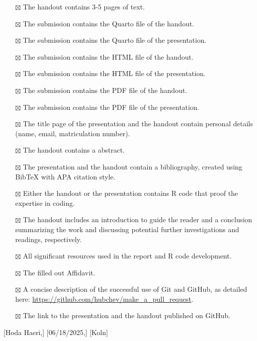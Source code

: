\documentclass[
  man,
  floatsintext,
  longtable,
  nolmodern,
  notxfonts,
  notimes,
  colorlinks=true,linkcolor=blue,citecolor=blue,urlcolor=blue]{apa7}
\providecommand{\tightlist}{%
  \setlength{\itemsep}{0pt}\setlength{\parskip}{0pt}}
\begin{document}
\begin{itemize}
\tightlist
\item[$\boxtimes$]
  The handout contains 3-5 pages of text.
\item[$\boxtimes$]
  The submission contains the Quarto file of the handout.
\item[$\boxtimes$]
  The submission contains the Quarto file of the presentation.
\item[$\boxtimes$]
  The submission contains the HTML file of the handout.
\item[$\boxtimes$]
  The submission contains the HTML file of the presentation.
\item[$\boxtimes$]
  The submission contains the PDF file of the handout.
\item[$\boxtimes$]
  The submission contains the PDF file of the presentation.
\item[$\boxtimes$]
  The title page of the presentation and the handout contain personal
  details (name, email, matriculation number).
\item[$\boxtimes$]
  The handout contains a abstract.
\item[$\boxtimes$]
  The presentation and the handout contain a bibliography, created using
  BibTeX with APA citation style.
\item[$\boxtimes$]
  Either the handout or the presentation contains R code that proof the
  expertise in coding.
\item[$\boxtimes$]
  The handout includes an introduction to guide the reader and a
  conclusion summarizing the work and discussing potential further
  investigations and readings, respectively.
\item[$\boxtimes$]
  All significant resources used in the report and R code development.
\item[$\boxtimes$]
  The filled out Affidavit.
\item[$\boxtimes$]
  A concise description of the successful use of Git and GitHub, as
  detailed here: \url{https://github.com/hubchev/make_a_pull_request}.
\item[$\boxtimes$]
  The link to the presentation and the handout published on GitHub.
\end{itemize}

{[}Hoda Haeri,{]} {[}06/18/2025,{]} {[}Koln{]}
\end{document}
